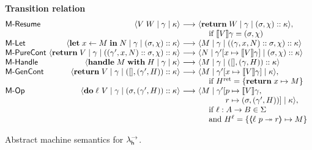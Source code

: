 \documentclass[12pt,phd,lfcs,twoside,openright,logo,leftchapter,normalheadings]{infthesis}
\theoremstyle{plain}
\theoremstyle{definition}
\begin{document}
\begin{figure}
\raggedright

\textbf{Transition relation}
\[
  \bl
  \ba{@{}l@{~}r@{~}c@{~}l@{~~}l@{}}
\mlab{Resume} & \cek{ V\;W \mid \env \mid \kappa}
               &\stepsto& \cek{ \Return \; W \mid \env \mid (\sigma, \chi) \cons \kappa},\\
               &&&\quad\text{ if }\val{V}{\env} = (\sigma, \chi) \\

\mlab{Let} & \cek{ \Let \; x \revto M \; \In \; N \mid \env \mid (\sigma, \chi) \cons \kappa}
    &\stepsto& \cek{ M \mid \env \mid ((\env,x,N) \cons \sigma, \chi) \cons \kappa} \\

\mlab{PureCont} &\cek{ \Return \; V \mid \env \mid ((\env',x,N) \cons \sigma, \chi) \cons \kappa}
        &\stepsto& \cek{ N \mid \env'[x \mapsto \val{V}{\env}] \mid (\sigma, \chi) \cons \kappa} \\

\mlab{Handle} & \cek{ \Handle \; M \; \With \; H \mid \env \mid \kappa}
       &\stepsto& \cek{ M \mid \env \mid (\nil, (\env, H)) \cons \kappa} \\

\mlab{GenCont} & \cek{ \Return \; V \mid \env \mid (\nil, (\env',H)) \cons \kappa}
                  &\stepsto& \cek{ M \mid \env'[x \mapsto \val{V}{\env}] \mid \kappa},\\
                  &&&\quad\text{ if } \hret = \{\Return\; x \mapsto M\} \\

\mlab{Op} & \cek{ \Do \; \ell~V \mid \env \mid (\sigma, (\env', H)) \cons \kappa }
                 &\stepsto& \cek{ M \mid \env'[\bl
                                               p \mapsto \val{V}\env, \\
                                               r \mapsto (\sigma, (\env', H))] \mid \kappa }, \\
                                               \el \\
                 &&&\quad\bl
                   \text{ if } \ell : A \to B \in \Sigma\\
                   \text{ and } \hell = \{\OpCase{\ell}{p}{r} \mapsto M\}
                   \el\\
\ea
\el
\]
\caption{Abstract machine semantics for $\lambda^\rightarrow_{\mathsf{h}}$.}
\label{fig:abstract-machine-semantics-handlers}
\end{figure}
\end{document}
